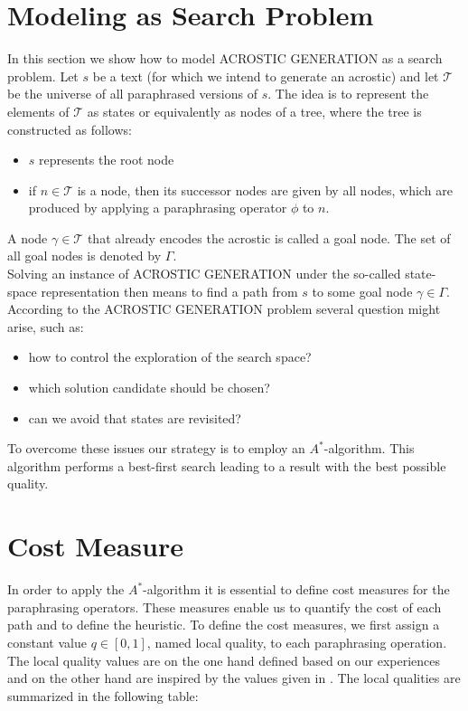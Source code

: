 \documentclass[11pt]{reportAlternative}
\begin{document}
\section{Modeling as Search Problem}
In this section we show how to model ACROSTIC GENERATION as a search problem. Let $s$ be a text (for which we intend to generate an acrostic) and let $\mathcal{T}$ be the universe of all paraphrased versions of $s$. The idea is to represent the elements of $\mathcal{T}$ as states or equivalently as nodes of a tree, where the tree is constructed as follows:
\begin{itemize}
\item $s$ represents the root node

\item if $n\in\mathcal{T}$ is a node, then its successor nodes are given by all nodes, which
are produced by applying a paraphrasing operator $\phi$ to $n$.

\end{itemize}

A node $\gamma\in\mathcal{T}$ that already encodes the acrostic is called a goal node. The set of all goal nodes is denoted by $\Gamma$.\\
Solving an instance of ACROSTIC GENERATION under the so-called state-space representation then means to find a path from $s$ to some goal node $\gamma\in\Gamma$. According to the 
ACROSTIC GENERATION problem several question might arise, such as:

\begin{itemize}

\item  how to control the exploration of the search space?

\item which solution candidate should be chosen?

\item can we avoid that states are revisited?

\end{itemize}

To overcome these issues our strategy is to employ an $A^*$-algorithm. This algorithm performs a best-first search leading to a result with the best possible quality.  



\section{Cost Measure}

In order to apply the $A^*$-algorithm it is essential to define cost measures for the paraphrasing operators. These measures enable us to quantify the cost of each path and to define the heuristic. To define the cost measures, we first assign a constant value $q\in [0,1]$, named local quality, to each paraphrasing operation. The local quality values are on the one hand defined based on our experiences and on the other hand are inspired by the values given in \cite{Stein}. The local qualities are summarized in the following table:
\end{document}

